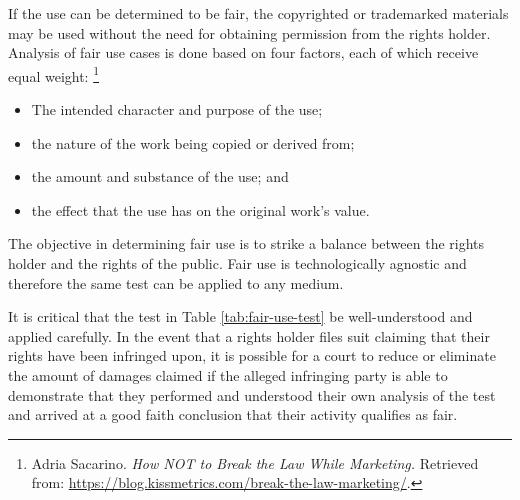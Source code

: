 \documentclass[letterpaper,11pt]{texMemo}
\begin{document}
  If the use can be determined to be fair, the copyrighted or trademarked materials may be used without the need for obtaining permission from the rights holder. Analysis of fair use cases is done based on four factors, each of which receive equal weight:
       \footnote{Adria Sacarino. \emph{How NOT to Break the Law While Marketing.} Retrieved from: \href{https://blog.kissmetrics.com/break-the-law-marketing/}{https://blog.kissmetrics.com/break-the-law-marketing/}.
       }
    \begin{itemize}
      \item The intended character and purpose of the use;
      \item the nature of the work being copied or derived from;
      \item the amount and substance of the use; and
      \item the effect that the use has on the original work's value.
    \end{itemize}
  The objective in determining fair use is to strike a balance between the rights holder and the rights of the public. Fair use is technologically agnostic and therefore the same test can be applied to any medium.

  It is critical that the test in Table \ref{tab:fair-use-test} be well-understood and applied carefully. In the event that a rights holder files suit claiming that their rights have been infringed upon, it is possible for a court to reduce or eliminate the amount of damages claimed if the alleged infringing party is able to demonstrate that they performed and understood their own analysis of the test and arrived at a good faith conclusion that their activity qualifies as fair.
\end{document}
